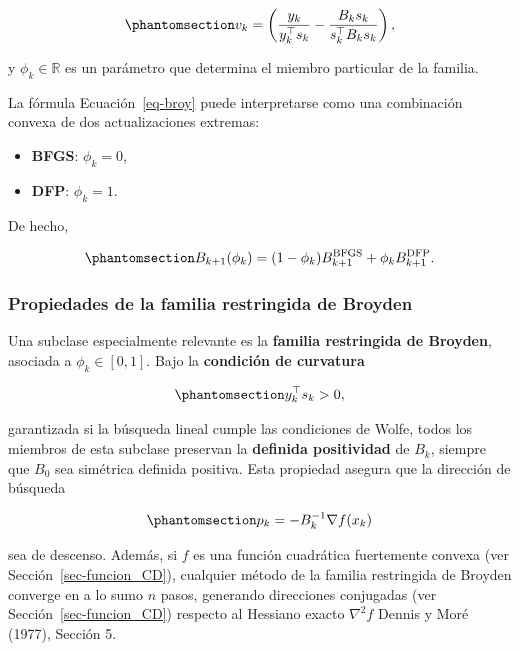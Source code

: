 \documentclass[
  spanish,
  us-letterpaper,
]{scrreprt}
\providecommand{\tightlist}{%
  \setlength{\itemsep}{0pt}\setlength{\parskip}{0pt}}
\numberwithin{equation}{section}
\begin{document}
\begin{equation}\phantomsection\label{eq-13}{
v_k = \left(\frac{y_k}{y_k^\top s_k} - \frac{B_k s_k}{s_k^\top B_k s_k}\right), 
}\end{equation}

y \(\phi_k \in \mathbb{R}\) es un parámetro que determina el miembro
particular de la familia.

La fórmula Ecuación~\ref{eq-broy} puede interpretarse como una
combinación convexa de dos actualizaciones extremas:

\begin{itemize}
\tightlist
\item
  \textbf{BFGS}: \(\phi_k = 0\),
\item
  \textbf{DFP}: \(\phi_k = 1\).
\end{itemize}

De hecho,

\begin{equation}\phantomsection\label{eq-14}{
B_{k+1}(\phi_k) = (1 - \phi_k) B_{k+1}^{\text{BFGS}} + \phi_k B_{k+1}^{\text{DFP}}. 
}\end{equation}

\subsubsection{Propiedades de la familia restringida de
Broyden}\label{propiedades-de-la-familia-restringida-de-broyden}

Una subclase especialmente relevante es la \textbf{familia restringida
de Broyden}, asociada a \(\phi_k \in [0,1]\). Bajo la \textbf{condición
de curvatura}

\begin{equation}\phantomsection\label{eq-15}{
y_k^\top s_k > 0, 
}\end{equation}

garantizada si la búsqueda lineal cumple las condiciones de Wolfe, todos
los miembros de esta subclase preservan la \textbf{definida positividad}
de \(B_k\), siempre que \(B_0\) sea simétrica definida positiva. Esta
propiedad asegura que la dirección de búsqueda

\begin{equation}\phantomsection\label{eq-16}{
p_k = -B_k^{-1} \nabla f(x_k)
}\end{equation}

sea de descenso. Además, si \(f\) es una función cuadrática fuertemente
convexa (ver Sección~\ref{sec-funcion_CD}), cualquier método de la
familia restringida de Broyden converge en a lo sumo \(n\) pasos,
generando direcciones conjugadas (ver Sección~\ref{sec-funcion_CD})
respecto al Hessiano exacto \(\nabla^2 f\) Dennis y Moré (1977), Sección
5.
\end{document}
